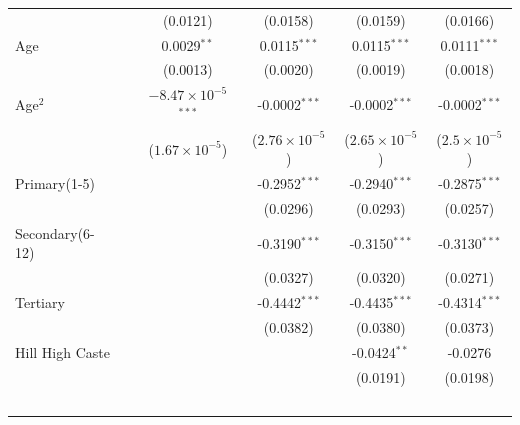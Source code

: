 \begin{tabular}{lccccc}
                                               &                         & (0.0121)                       & (0.0158)                & (0.0159)                & (0.0166)\\   
   Age                                         &                         & 0.0029$^{**}$                  & 0.0115$^{***}$          & 0.0115$^{***}$          & 0.0111$^{***}$\\   
                                               &                         & (0.0013)                       & (0.0020)                & (0.0019)                & (0.0018)\\   
   Age$^2$                                &                         & $-8.47\times 10^{-5}$$^{***}$  & -0.0002$^{***}$         & -0.0002$^{***}$         & -0.0002$^{***}$\\   
                                               &                         & ($1.67\times 10^{-5}$)         & ($2.76\times 10^{-5}$)  & ($2.65\times 10^{-5}$)  & ($2.5\times 10^{-5}$)\\    
   Primary(1-5)     &                         &                                & -0.2952$^{***}$         & -0.2940$^{***}$         & -0.2875$^{***}$\\   
                                               &                         &                                & (0.0296)                & (0.0293)                & (0.0257)\\   
   Secondary(6-12)  &                         &                                & -0.3190$^{***}$         & -0.3150$^{***}$         & -0.3130$^{***}$\\   
                                               &                         &                                & (0.0327)                & (0.0320)                & (0.0271)\\   
   Tertiary         &                         &                                & -0.4442$^{***}$         & -0.4435$^{***}$         & -0.4314$^{***}$\\   
                                               &                         &                                & (0.0382)                & (0.0380)                & (0.0373)\\   
   Hill High Caste              &                         &                                &                         & -0.0424$^{**}$          & -0.0276\\   
                                               &                         &                                &                         & (0.0191)                & (0.0198)\\   
$$
\end{tabular}
